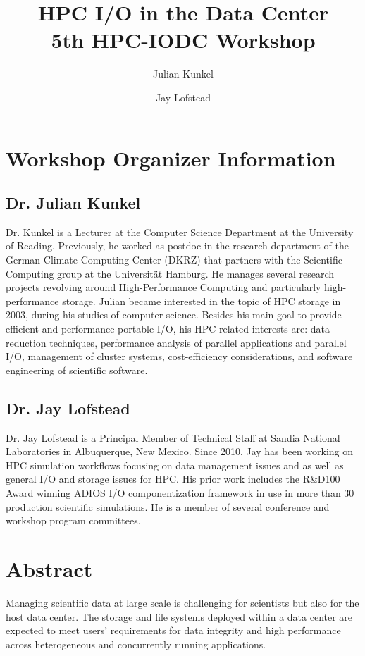 \documentclass[a4paper,10pt]{article}
\title{HPC I/O in the Data Center\\ {\normalsize 5th HPC-IODC Workshop}}
\author{Julian Kunkel \and Jay Lofstead}
\begin{document}
\maketitle



\section{Workshop Organizer Information}

\subsection{Dr. Julian Kunkel}

Dr. Kunkel is a Lecturer at the Computer Science Department at the University of Reading. Previously, he worked as postdoc in the research department of the German Climate Computing Center (DKRZ) that partners with the Scientific Computing group at the Universität Hamburg.
He manages several research projects revolving around High-Performance Computing and particularly high-performance storage. Julian became interested in the topic of HPC storage in 2003, during his studies of computer science. Besides his main goal to provide efficient and performance-portable I/O, his HPC-related interests are: data reduction techniques, performance analysis of parallel applications and parallel I/O, management of cluster systems, cost-efficiency considerations, and software engineering of scientific software.

\subsection{Dr. Jay Lofstead}

Dr. Jay Lofstead is a Principal Member of Technical Staff at Sandia National
Laboratories in Albuquerque, New Mexico. Since 2010, Jay has been working on
HPC simulation workflows focusing on data management issues and as well as
general I/O and storage issues for HPC.  His prior work includes the R\&D100
Award winning ADIOS I/O componentization framework in use in more than 30
production scientific simulations. He is a member of several conference and
workshop program committees.

\section{Abstract}
Managing scientific data at large scale is challenging for scientists but also for the host data center.
The storage and file systems deployed within a data center are expected to meet users' requirements for data integrity and high performance across heterogeneous and concurrently running applications.
\end{document}
